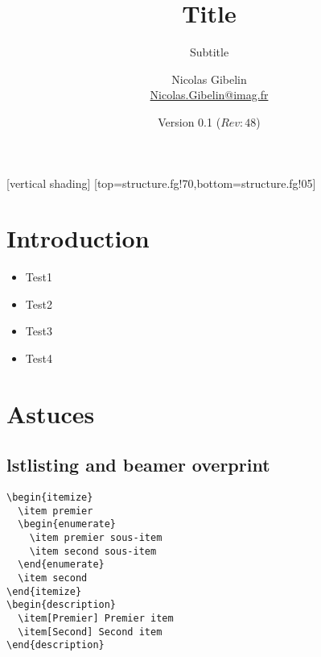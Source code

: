 \documentclass[utf8]{beamer}
\date{Version 0.1 ($Rev: 48 $)}
\author{Nicolas Gibelin\\%
\href{mailto:Nicolas.Gibelin@imag.fr}{Nicolas.Gibelin@imag.fr}}
\title{Title}
\subtitle{Subtitle}
\begin{document}
\frame{\titlepage}

[vertical shading]%
[top=structure.fg!70,bottom=structure.fg!05]
\section{Introduction}

\begin{frame}
\begin{itemize}
  \pause \item Test1
  \pause \item Test2
  \pause \item Test3
  \pause \item Test4
\end{itemize}
\end{frame}

\section{Astuces}

\subsection{lstlisting and beamer overprint}

\begin{lrbox}{\lstbox}
{\tiny\begin{lstlisting}
\begin{itemize}
  \item premier
  \begin{enumerate}
    \item premier sous-item
    \item second sous-item
  \end{enumerate}
  \item second
\end{itemize}
\begin{description}
  \item[Premier] Premier item
  \item[Second] Second item
\end{description}
\end{lstlisting}}
\end{lrbox}
\end{document}
